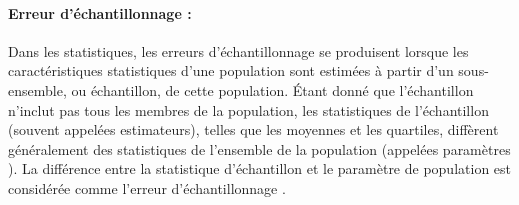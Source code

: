 		\paragraph*{Erreur d'échantillonnage :}
		Dans les statistiques, les erreurs d'échantillonnage se produisent lorsque les caractéristiques statistiques d'une population sont estimées à partir d'un sous-ensemble, ou échantillon, de cette population. Étant donné que l'échantillon n'inclut pas tous les membres de la population, les statistiques de l'échantillon (souvent appelées estimateurs), telles que les moyennes et les quartiles, diffèrent généralement des statistiques de l'ensemble de la population (appelées paramètres ). La différence entre la statistique d'échantillon et le paramètre de population est considérée comme l'erreur d'échantillonnage \cite{sarndal2003model}. 
	
	
	
		
		
		
		
		
			
